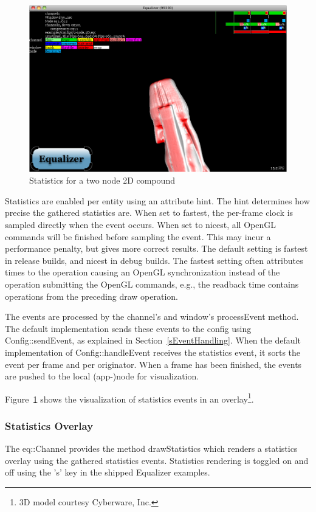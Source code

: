 \documentclass[10pt,a4]{scrartcl}
\newcommand{\fig}[1]{Figure~\ref{#1}}
\newcommand{\sref}[1]{Section~\ref{#1}}
\begin{document}
\begin{figure}
  \includegraphics[width=.618\textwidth]{images/statistics}
  {\caption{\label{fStatistics}Statistics for a two node 2D compound}}
\end{figure}
Statistics are enabled per entity using an attribute hint. The hint determines
how precise the gathered statistics are. When set to \textsf{fastest}, the
per-frame clock is sampled directly when the event occurs. When set to
\textsf{nicest}, all OpenGL commands will be finished before sampling the
event. This may incur a performance penalty, but gives more correct results. The
default setting is fastest in release builds, and nicest in debug builds. The
fastest setting often attributes times to the operation causing an OpenGL
synchronization instead of the operation submitting the OpenGL commands, e.g.,
the readback time contains operations from the preceding draw operation.

The events are processed by the channel's and window's \textsf{processEvent}
method. The default implementation sends these events to the config using
\textsf{Config::sendEvent}, as explained in \sref{sEventHandling}. When the
default implementation of \textsf{Config::handleEvent} receives the statistics
event, it sorts the event per frame and per originator. When a frame has been
finished, the events are pushed to the local (app-)node for visualization.

\fig{fStatistics} shows the visualization of statistics events in an
overlay\footnote{3D model courtesy Cyberware, Inc.}.

\subsubsection{\label{sStatisticsOverlay}Statistics Overlay}

The \textsf{eq::Channel} provides the method \textsf{drawStatistics} which
renders a statistics overlay using the gathered statistics events. Statistics
rendering is toggled on and off using the 's' key in the shipped Equalizer
examples.
\end{document}

